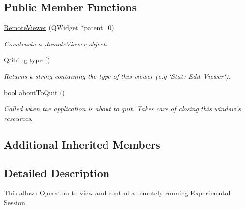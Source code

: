 \subsection*{Public Member Functions}
\begin{DoxyCompactItemize}
\item 
\hyperlink{class_remote_viewer_a736db3e32f94c4eaab0791be858e117b}{Remote\-Viewer} (Q\-Widget $\ast$parent=0)
\begin{DoxyCompactList}\small\item\em Constructs a \hyperlink{class_remote_viewer}{Remote\-Viewer} object. \end{DoxyCompactList}\item 
\hypertarget{class_remote_viewer_a2d53023681a38efc405058265e1de27c}{Q\-String \hyperlink{class_remote_viewer_a2d53023681a38efc405058265e1de27c}{type} ()}\label{class_remote_viewer_a2d53023681a38efc405058265e1de27c}

\begin{DoxyCompactList}\small\item\em Returns a string containing the type of this viewer (e.\-g \char`\"{}\-State Edit Viewer\char`\"{}). \end{DoxyCompactList}\item 
bool \hyperlink{class_remote_viewer_a9b071710568063f41739782198de227a}{about\-To\-Quit} ()
\begin{DoxyCompactList}\small\item\em Called when the application is about to quit. Takes care of closing this window's resources. \end{DoxyCompactList}\end{DoxyCompactItemize}
\subsection*{Additional Inherited Members}


\subsection{Detailed Description}
This allows Operators to view and control a remotely running Experimental Session. 

